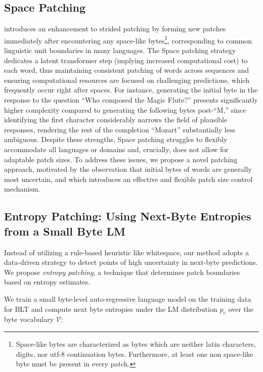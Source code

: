 \subsection{Space Patching}
\label{section:white-patch}

\citet{slagle2024spacebyte} introduces an enhancement to strided patching by forming new patches immediately after encountering any space-like bytes\footnote{
    Space-like bytes are characterized as bytes which are neither latin characters, digits, nor utf-8 continuation bytes. Furthermore, at least one non space-like byte must be present in every patch.}, corresponding to common linguistic unit boundaries in many languages. The Space patching strategy dedicates a latent transformer step (implying increased computational cost) to each word, thus maintaining consistent patching of words across sequences and ensuring computational resources are focused on challenging predictions, which frequently occur right after spaces. For instance, generating the initial byte in the response to the question ``Who composed the Magic Flute?\uline{\hspace{.6em}}'' presents significantly higher complexity compared to generating the following bytes post-``M,'' since identifying the first character considerably narrows the field of plausible responses, rendering the rest of the completion ``Mozart'' substantially less ambiguous. Despite these strengths, Space patching struggles to flexibly accommodate all languages or domains and, crucially, does not allow for adaptable patch sizes. To address these issues, we propose a novel patching approach, motivated by the observation that initial bytes of words are generally most uncertain, and which introduces an effective and flexible patch size control mechanism.

\subsection{Entropy Patching: Using Next-Byte Entropies from a Small Byte LM}
\label{section:dyn-patch}

Instead of utilizing a rule-based heuristic like whitespace, our method adopts a data-driven strategy to detect points of high uncertainty in next-byte predictions. We propose \textit{entropy patching}, a technique that determines patch boundaries based on entropy estimates.

We train a small byte-level auto-regressive language model on the training data for {\textsc BLT} and compute next byte entropies under the LM distribution $p_{e}$ over the byte vocabulary $\mathcal{V}$:

